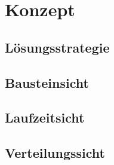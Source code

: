 \chapter{Konzept}
\label{ch:Konzept}
\section{Lösungsstrategie}
\section{Bausteinsicht}
\section{Laufzeitsicht}
\section{Verteilungssicht}
